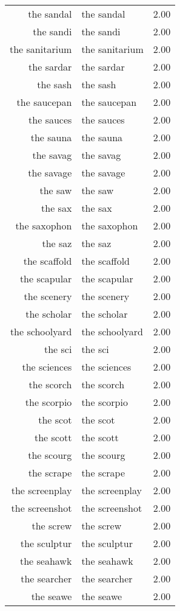\begin{table}[ht]
\begin{tabular}{rlr}
  the sandal & the sandal & 2.00 \\ 
  the sandi & the sandi & 2.00 \\ 
  the sanitarium & the sanitarium & 2.00 \\ 
  the sardar & the sardar & 2.00 \\ 
  the sash & the sash & 2.00 \\ 
  the saucepan & the saucepan & 2.00 \\ 
  the sauces & the sauces & 2.00 \\ 
  the sauna & the sauna & 2.00 \\ 
  the savag & the savag & 2.00 \\ 
  the savage & the savage & 2.00 \\ 
  the saw & the saw & 2.00 \\ 
  the sax & the sax & 2.00 \\ 
  the saxophon & the saxophon & 2.00 \\ 
  the saz & the saz & 2.00 \\ 
  the scaffold & the scaffold & 2.00 \\ 
  the scapular & the scapular & 2.00 \\ 
  the scenery & the scenery & 2.00 \\ 
  the scholar & the scholar & 2.00 \\ 
  the schoolyard & the schoolyard & 2.00 \\ 
  the sci & the sci & 2.00 \\ 
  the sciences & the sciences & 2.00 \\ 
  the scorch & the scorch & 2.00 \\ 
  the scorpio & the scorpio & 2.00 \\ 
  the scot & the scot & 2.00 \\ 
  the scott & the scott & 2.00 \\ 
  the scourg & the scourg & 2.00 \\ 
  the scrape & the scrape & 2.00 \\ 
  the screenplay & the screenplay & 2.00 \\ 
  the screenshot & the screenshot & 2.00 \\ 
  the screw & the screw & 2.00 \\ 
  the sculptur & the sculptur & 2.00 \\ 
  the seahawk & the seahawk & 2.00 \\ 
  the searcher & the searcher & 2.00 \\ 
  the seawe & the seawe & 2.00 \\ 

\end{tabular}
\end{table}
